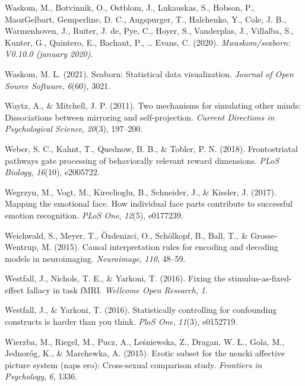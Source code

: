 \documentclass[11pt,american,a4paper,oneside,]{memoir} %
\begin{document}
\leavevmode\hypertarget{ref-Waskom2020-qq}{}%
Waskom, M., Botvinnik, O., Ostblom, J., Lukauskas, S., Hobson, P., MaozGelbart, Gemperline, D. C., Augspurger, T., Halchenko, Y., Cole, J. B., Warmenhoven, J., Ruiter, J. de, Pye, C., Hoyer, S., Vanderplas, J., Villalba, S., Kunter, G., Quintero, E., Bachant, P., \ldots{} Evans, C. (2020). \emph{Mwaskom/seaborn: V0.10.0 (january 2020)}.

\leavevmode\hypertarget{ref-waskom2021seaborn}{}%
Waskom, M. L. (2021). Seaborn: Statistical data visualization. \emph{Journal of Open Source Software}, \emph{6}(60), 3021.

\leavevmode\hypertarget{ref-waytz2011two}{}%
Waytz, A., \& Mitchell, J. P. (2011). Two mechanisms for simulating other minds: Dissociations between mirroring and self-projection. \emph{Current Directions in Psychological Science}, \emph{20}(3), 197--200.

\leavevmode\hypertarget{ref-weber2018frontostriatal}{}%
Weber, S. C., Kahnt, T., Quednow, B. B., \& Tobler, P. N. (2018). Frontostriatal pathways gate processing of behaviorally relevant reward dimensions. \emph{PLoS Biology}, \emph{16}(10), e2005722.

\leavevmode\hypertarget{ref-Wegrzyn2017-ke}{}%
Wegrzyn, M., Vogt, M., Kireclioglu, B., Schneider, J., \& Kissler, J. (2017). Mapping the emotional face. How individual face parts contribute to successful emotion recognition. \emph{PLoS One}, \emph{12}(5), e0177239.

\leavevmode\hypertarget{ref-Weichwald2015-aj}{}%
Weichwald, S., Meyer, T., Özdenizci, O., Schölkopf, B., Ball, T., \& Grosse-Wentrup, M. (2015). Causal interpretation rules for encoding and decoding models in neuroimaging. \emph{Neuroimage}, \emph{110}, 48--59.

\leavevmode\hypertarget{ref-westfall2016fixing}{}%
Westfall, J., Nichols, T. E., \& Yarkoni, T. (2016). Fixing the stimulus-as-fixed-effect fallacy in task fMRI. \emph{Wellcome Open Research}, \emph{1}.

\leavevmode\hypertarget{ref-westfall2016statistically}{}%
Westfall, J., \& Yarkoni, T. (2016). Statistically controlling for confounding constructs is harder than you think. \emph{PloS One}, \emph{11}(3), e0152719.

\leavevmode\hypertarget{ref-wierzba2015erotic}{}%
Wierzba, M., Riegel, M., Pucz, A., Leśniewska, Z., Dragan, W. Ł., Gola, M., Jednoróg, K., \& Marchewka, A. (2015). Erotic subset for the nencki affective picture system (naps ero): Cross-sexual comparison study. \emph{Frontiers in Psychology}, \emph{6}, 1336.
\end{document}
